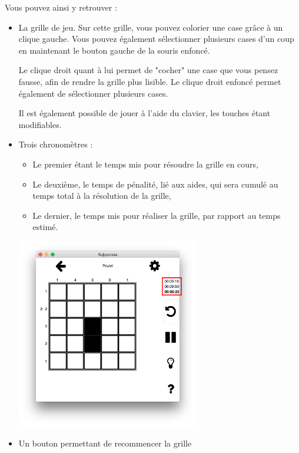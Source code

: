 \documentclass[a4paper, 12pt]{report}
\begin{document}
            Vous pouvez ainsi y retrouver :
            \begin{itemize}
                \item La grille de jeu.
                Sur cette grille, vous pouvez colorier une case grâce à un clique gauche. Vous pouvez également sélectionner plusieurs cases d'un coup en maintenant le bouton gauche de la souris enfoncé.
                
                Le clique droit quant à lui permet de "cocher" une case que vous pensez fausse, afin de rendre la grille plus lisible. Le clique droit enfoncé permet également de sélectionner plusieurs cases.
                
                Il est également possible de jouer à l'aide du clavier, les touches étant modifiables.
                \item Trois chronomètres : 
                \begin{itemize}
                    \item Le premier étant le temps mis pour résoudre la grille en cours,
                    \item Le deuxième, le temps de pénalité, lié aux aides, qui sera cumulé au temps total à la résolution de la grille,
                    \item Le dernier, le temps mis pour réaliser la grille, par rapport au temps estimé.
                \end{itemize}
                \begin{minipage}{\linewidth}
                    \centering
			        \includegraphics[width=8cm]{screenTimer.png}
	            \end{minipage}
                \item Un bouton permettant de recommencer la grille\\

\end{itemize}
\end{document}
